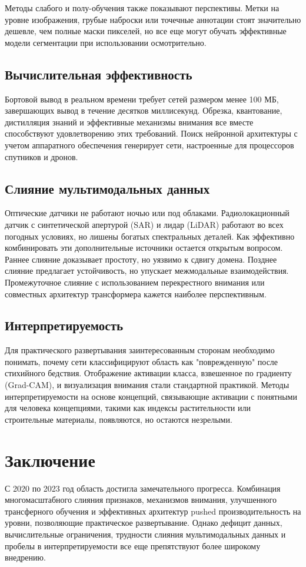 \documentclass[12pt,a4paper]{article}
\begin{document}
Методы слабого и полу-обучения также показывают перспективы. Метки на уровне изображения, грубые наброски или точечные аннотации стоят значительно дешевле, чем полные маски пикселей, но все еще могут обучать эффективные модели сегментации при использовании осмотрительно.

\subsection{Вычислительная эффективность}
Бортовой вывод в реальном времени требует сетей размером менее 100 МБ, завершающих вывод в течение десятков миллисекунд. Обрезка, квантование, дистилляция знаний и эффективные механизмы внимания все вместе способствуют удовлетворению этих требований. Поиск нейронной архитектуры с учетом аппаратного обеспечения генерирует сети, настроенные для процессоров спутников и дронов.

\subsection{Слияние мультимодальных данных}
Оптические датчики не работают ночью или под облаками. Радиолокационный датчик с синтетической апертурой (SAR) и лидар (LiDAR) работают во всех погодных условиях, но лишены богатых спектральных деталей. Как эффективно комбинировать эти дополнительные источники остается открытым вопросом. Раннее слияние доказывает простоту, но уязвимо к сдвигу домена. Позднее слияние предлагает устойчивость, но упускает межмодальные взаимодействия. Промежуточное слияние с использованием перекрестного внимания или совместных архитектур трансформера кажется наиболее перспективным.

\subsection{Интерпретируемость}
Для практического развертывания заинтересованным сторонам необходимо понимать, почему сети классифицируют область как "поврежденную" после стихийного бедствия. Отображение активации класса, взвешенное по градиенту (Grad-CAM), и визуализация внимания стали стандартной практикой. Методы интерпретируемости на основе концепций, связывающие активации с понятными для человека концепциями, такими как индексы растительности или строительные материалы, появляются, но остаются незрелыми.

\section{Заключение}
\label{sec:conclusion}
С 2020 по 2023 год область достигла замечательного прогресса. Комбинация многомасштабного слияния признаков, механизмов внимания, улучшенного трансферного обучения и эффективных архитектур pushed производительность на уровни, позволяющие практическое развертывание. Однако дефицит данных, вычислительные ограничения, трудности слияния мультимодальных данных и пробелы в интерпретируемости все еще препятствуют более широкому внедрению.
\end{document}
